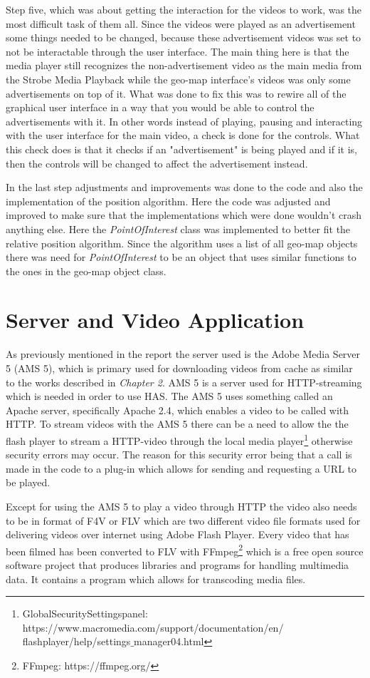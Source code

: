 Step five, which was about getting the interaction for the videos to work, was the most difficult task of them all. Since the videos were played as an advertisement some things needed to be changed, because these advertisement videos was set to not be interactable through the user interface. The main thing here is that the media player still recognizes the non-advertisement video as the main media from the Strobe Media Playback while the geo-map interface's videos was only some advertisements on top of it. What was done to fix this was to rewire all of the graphical user interface in a way that you would be able to control the advertisements with it. In other words instead of playing, pausing and interacting with the user interface for the main video, a check is done for the controls. What this check does is that it checks if an "advertisement" is being played and if it is, then the controls will be changed to affect the advertisement instead.

In the last step adjustments and improvements was done to the code and also the implementation of the position algorithm. Here the code was adjusted and improved to make sure that the implementations which were done wouldn't crash anything else. Here the \textit{PointOfInterest} class was implemented to better fit the relative position algorithm. Since the algorithm uses a list of all geo-map objects there was need for \textit{PointOfInterest} to be an object that uses similar functions to the ones in the geo-map object class. 

\section{Server and Video Application}
\label{sec:server}

As previously mentioned in the report the server used is the Adobe Media Server 5 (AMS 5), which is primary used for downloading videos from cache as similar to the works described in \textit{Chapter 2}. AMS 5 is a server used for HTTP-streaming which is needed in order to use HAS. The AMS 5 uses something called an Apache server, specifically Apache 2.4, which enables a video to be called with HTTP. To stream videos with the AMS 5 there can be a need to allow the the flash player to stream a HTTP-video through the local media player\footnote{Global\:Security\:Settings\:panel: https://www.macromedia.com/support/documentation/en/\\flashplayer/help/settings$\_$manager04.html} otherwise security errors may occur. The reason for this security error being that a call is made in the code to a plug-in which allows for sending and requesting a URL to be played.

Except for using the AMS 5 to play a video through HTTP the video also needs to be in format of F4V or FLV which are two different video file formats used for delivering videos over internet using Adobe Flash Player. Every video that has been filmed has been converted to FLV with FFmpeg\footnote{FFmpeg: https://ffmpeg.org/} which is a free open source software project that produces libraries and programs for handling multimedia data. It contains a program which allows for transcoding media files.

